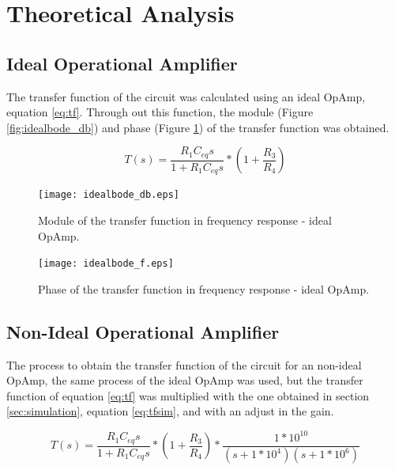 \newpage
\section{Theoretical Analysis}
\label{sec:analysis}

\subsection{Ideal Operational Amplifier}

The transfer function of the circuit was calculated using an ideal OpAmp, equation \ref{eq:tf}. Through out this function, the module (Figure \ref{fig:idealbode_db}) and phase (Figure \ref{fig:idealbode_f}) of the transfer function was obtained.

\begin{equation}
    T(s)=\frac{R_1C_{eq}s}{1+R_1C_{eq}s}*\left ( 1+\frac{R_3}{R_4} \right )
    \label{eq:tf}
\end{equation}

\begin{figure}[h]
  \centering
  \begin{minipage}[b]{0.45\textwidth}
    \texttt{[image: idealbode\_db.eps]}
    \caption{Module of the transfer function in frequency response - ideal OpAmp.}
    \label{fig:idealbode_db}
  \end{minipage}
  \hfill
  \begin{minipage}[b]{0.45\textwidth}
    \texttt{[image: idealbode\_f.eps]}
    \caption{Phase of the transfer function in frequency response - ideal OpAmp.}
    \label{fig:idealbode_f}
  \end{minipage}
\end{figure}

\subsection{Non-Ideal Operational Amplifier}

The process to obtain the transfer function of the circuit for an non-ideal OpAmp, the same process of the ideal OpAmp was used, but the transfer function of equation \ref{eq:tf} was multiplied with the one obtained in section \ref{sec:simulation}, equation \ref{eq:tfsim}, and with an adjust in the gain.

\begin{equation}
    T(s)=\frac{R_1C_{eq}s}{1+R_1C_{eq}s}*\left ( 1+\frac{R_3}{R_4} \right )* \frac{1*10^{10}}{(s+1*10^4)(s+1*10^6)}
    \label{eq:tf+tfsim}
\end{equation}

